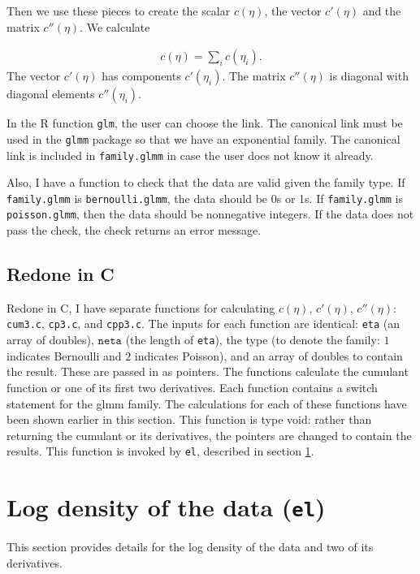 \documentclass{article}
\begin{document}
Then we use these pieces to create the scalar $c(\eta)$, the vector $c'(\eta)$ and the matrix $c''(\eta)$. We calculate

\begin{align}
c(\eta)= \sum_i c(\eta_i).
\end{align}
 The vector $c'(\eta)$ has components $c'(\eta_i)$. The matrix $c''(\eta)$ is diagonal with diagonal elements $c''(\eta_i)$.

In the R function \texttt{glm}, the user can choose the link. The canonical link must be used in the \texttt{glmm} package so that we have an exponential family. The canonical link is included in \texttt{family.glmm}  in case the user does not know it already.

Also, I have a function to check that the data are valid given the family type. If \texttt{family.glmm} is \texttt{bernoulli.glmm}, the data should be 0s or 1s. If \texttt{family.glmm} is \texttt{poisson.glmm}, then the data should be nonnegative integers.  If the data does not pass the check, the check returns an error message. 

\subsection{Redone in C}
Redone in C, I  have  separate functions for calculating $c(\eta)$, $c'(\eta)$, $c''(\eta)$: \texttt{cum3.c}, \texttt{cp3.c}, and \texttt{cpp3.c}. The inputs for each function are identical:  \texttt{eta} (an array of doubles), $\texttt{neta}$ (the length of \texttt{eta}), the type (to denote the family: $1$ indicates Bernoulli and $2$ indicates Poisson), and an array of doubles to contain the result. These are passed in as pointers. The functions  calculate  the cumulant function or one of its first two derivatives. Each function  contains a switch statement for the glmm family. The calculations for each of these functions have  been shown earlier in this section. This function is type void: rather than returning the cumulant or its derivatives, the pointers are changed to contain the results. This function is invoked by \texttt{el}, described in section \ref{sec:el}.


\section{Log density of the data (\texttt{el})}\label{sec:el}
This section provides details for the log density of the data and two of its derivatives.  
\end{document}
